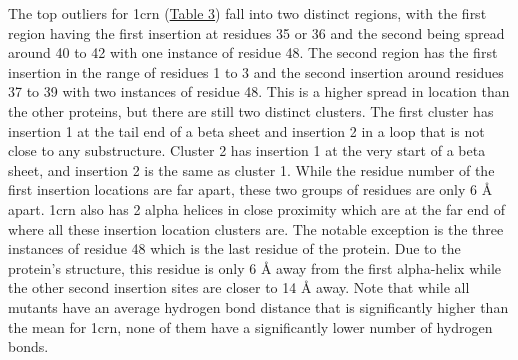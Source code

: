 \documentclass[sigconf, screen, authorversion, authoraddress=false, oneside]{acmart}
\begin{document}
The top outliers for 1crn (\hyperref[table:3]{Table 3}) fall into two distinct regions, with the first region having the first insertion at residues 35 or 36 and the second being spread around 40 to 42 with one instance of residue 48. The second region has the first insertion in the range of residues 1 to 3 and the second insertion around residues 37 to 39 with two instances of residue 48. This is a higher spread in location than the other proteins, but there are still two distinct clusters. The first cluster has insertion 1 at the tail end of a beta sheet and insertion 2 in a loop that is not close to any substructure. Cluster 2 has insertion 1 at the very start of a beta sheet, and insertion 2 is the same as cluster 1. While the residue number of the first insertion locations are far apart, these two groups of residues are only 6 Å apart. 1crn also has 2 alpha helices in close proximity which are at the far end of where all these insertion location clusters are. The notable exception is the three instances of residue 48 which is the last residue of the protein. Due to the protein's structure, this residue is only 6 Å away from the first alpha-helix while the other second insertion sites are closer to 14 Å away. Note that while all mutants have an average hydrogen bond distance that is significantly higher than the mean for 1crn, none of them have a significantly lower number of hydrogen bonds.
\end{document}
